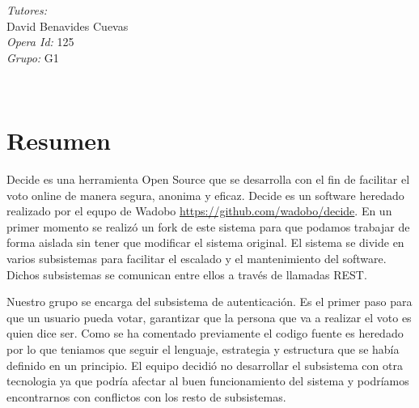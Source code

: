 \documentclass[12pt]{article}
\begin{document}
\begin{titlepage}
\begin{minipage}{0.4\textwidth}
			\begin{flushright} \large
			\emph{Tutores:} \\
			David Benavides Cuevas\\
            \emph{Opera Id: }
            125\\
			\emph{Grupo: }            
            G1\\
            
            
		\end{flushright}
        
	\end{minipage}\\[2 cm]
	
	
    
    
    
    
	
\end{titlepage}


\tableofcontents
\listoffigures
\listoftables
\pagebreak


\section{Resumen}
Decide es una herramienta Open Source que se desarrolla con el fin de facilitar el voto online de manera segura, anonima y eficaz. Decide es un software heredado realizado por el equpo de Wadobo \url{https://github.com/wadobo/decide}.
En un primer momento se realizó un fork de este sistema para que podamos trabajar de forma aislada sin tener que modificar el sistema original.
El sistema se divide en varios subsistemas para facilitar el escalado y el mantenimiento del software. Dichos subsistemas se comunican entre ellos a través de llamadas REST.  


Nuestro grupo se encarga del subsistema de autenticación. Es el primer paso  para que un usuario pueda votar, garantizar que la persona que va a realizar el voto es quien dice ser. Como se ha comentado previamente el codigo fuente es heredado por lo que teniamos que seguir el lenguaje, estrategia y estructura que se había definido en un principio. El equipo decidió no desarrollar el subsistema con otra tecnologia ya que podría afectar al buen funcionamiento del sistema y podríamos encontrarnos con conflictos con los resto de subsistemas.  
\end{document}
